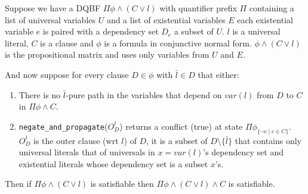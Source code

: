 \documentclass[runningheads]{llncs}
\begin{document}
\begin{lemma}\label{lem:redsound}
	
	Suppose we have a DQBF $\Pi \phi\wedge (C\vee l )$ with quantifier prefix $\Pi$ containing a list of universal variables $U$ and a list of existential variables $E$ each existential variable $e$ is paired with a dependency set $D_e$ a subset of $U$. 
	$l$ is a universal literal, $C$ is a clause and $\phi$ is a formula in conjunctive normal form.
	$\phi\wedge (C\vee l )$ is the propositional matrix and uses only variables from $U$ and $E$.
	
	 And now suppose for every clause $D\in \phi$ with $\bar l \in D$ that either:
	 \begin{enumerate}
	 	\item There is no $\bar l$-pure path in the variables that depend on $var(l)$ from $D$ to $C$ in $\Pi \phi \wedge C$.
	 	\item  \texttt{negate\_and\_propagate}($O^l_D$) returns a conflict (true) at state $\Pi \phi_{\{\neg c \mid c \in C\}}$. $O^l_D$ is the outer clause (wrt $l$) of $D$, it is a subset of $D\setminus\{\bar l\}$ that contains only universal literals that of universals in $x=var(l)$'s dependency set and existential literals whose dependency set is a subset $x$'s.
	 	
	 \end{enumerate}

	Then if $\Pi \phi\wedge (C\vee l )$ is satisfiable then $\Pi \phi\wedge (C\vee l )\wedge C$ is satisfiable.
	
\end{lemma}
\end{document}

